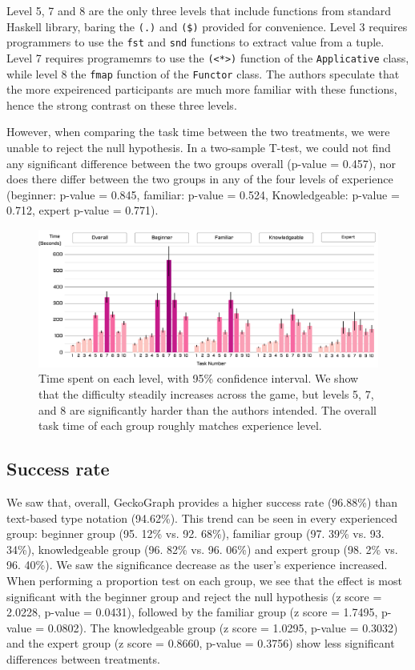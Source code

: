 Level 5, 7 and 8 are the only three levels that include functions from standard Haskell library, baring the \texttt{(.)} and \texttt{(\$)} provided for convenience. Level 3 requires programmers to use the \texttt{fst} and \texttt{snd} functions to extract value from a tuple. Level 7 requires programemrs to use the \texttt{(<*>)} function of the \texttt{Applicative} class, while level 8 the \texttt{fmap} function of the \texttt{Functor} class. The authors speculate that the more expeirenced participants are much more familiar with these functions, hence the strong contrast on these three levels. 


However, when comparing the task time between the two treatments, we were unable to reject the null hypothesis. In a two-sample T-test, we could not find any significant difference between the two groups overall (p-value = 0.457), nor does there differ between the two groups in any of the four levels of experience (beginner: p-value = 0.845, familiar: p-value = 0.524, Knowledgeable: p-value = 0.712, expert p-value = 0.771).


\begin{figure}[hbt]
  \includegraphics[width=\linewidth]{figures/LevelTime}
  \caption[Time spent on each level, with 95\% confidence interval]{\label{fig:level-time} Time spent on each level, with 95\% confidence interval. We show that the difficulty steadily increases across the game, but levels 5, 7, and 8 are significantly harder than the authors intended. The overall task time of each group roughly matches experience level.}
\end{figure}


\subsection{Success rate}
We saw that, overall, GeckoGraph provides a higher success rate (96.88\%) than text-based type notation (94.62\%). This trend can be seen in every experienced group: beginner group (95. 12\% vs. 92. 68\%), familiar group (97. 39\% vs. 93. 34\%), knowledgeable group (96. 82\% vs. 96. 06\%) and expert group (98. 2\% vs. 96. 40\%). We saw the significance decrease as the user's experience increased. When performing a proportion test on each group, we see that the effect is most significant with the beginner group and reject the null hypothesis (z score = 2.0228, p-value = 0.0431), followed by the familiar group (z score = 1.7495, p-value = 0.0802). The knowledgeable group (z score = 1.0295, p-value = 0.3032) and the expert group (z score = 0.8660, p-value = 0.3756) show less significant differences between treatments. 


